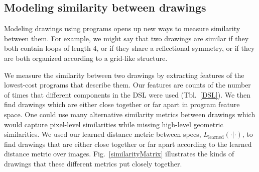 \documentclass{article}
\newcommand{\probability}{\mathds{P}} %
\theoremstyle{definition}
\begin{document}


\subsection{Modeling similarity between drawings}
Modeling drawings using programs opens up new ways to measure similarity between them.
For example, we might say that two drawings are similar if they both contain loops of length 4,
or if they share a reflectional symmetry,
or if they are both organized according to a grid-like structure.

We measure the similarity between two drawings by extracting features
of the lowest-cost programs that describe them. Our features are counts of the number of times that different components in the
DSL were used (Tbl.~\ref{DSL}).
We  then find drawings which are either close together or far apart in program feature space.
One could use many
alternative similarity metrics between drawings which would capture pixel-level similarities while missing high-level geometric similarities.
We used our learned distance metric between specs, $L_{\text{learned}}(\cdot|\cdot)$,
to find drawings that are either close together or far apart according to the learned
distance metric over images.
Fig.~\ref{similarityMatrix} illustrates the kinds of drawings that these different metrics put closely together.
\end{document}
